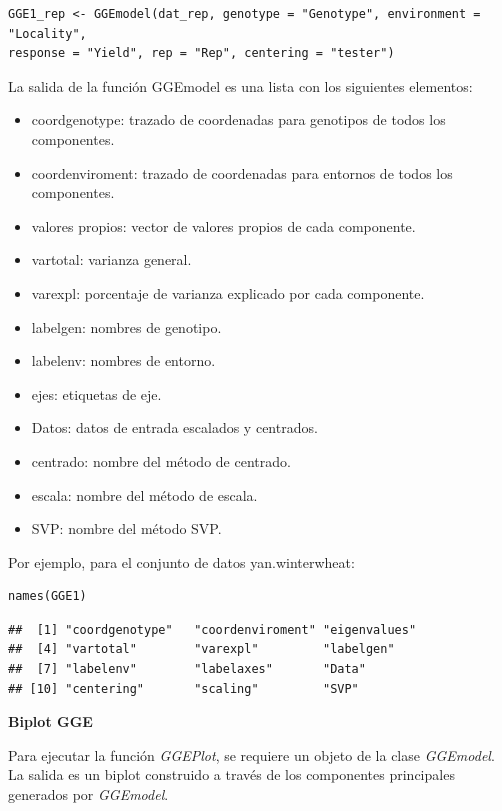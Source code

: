 \begin{lstlisting}
GGE1_rep <- GGEmodel(dat_rep, genotype = "Genotype", environment = "Locality", 
response = "Yield", rep = "Rep", centering = "tester")
\end{lstlisting}


La salida de la función GGEmodel es una lista con los siguientes elementos:


\begin{itemize}
\item coordgenotype: trazado de coordenadas para genotipos de todos los componentes.
\item coordenviroment: trazado de coordenadas para entornos de todos los componentes.
\item valores propios: vector de valores propios de cada componente.
\item vartotal: varianza general.
\item varexpl: porcentaje de varianza explicado por cada componente.
\item labelgen: nombres de genotipo.
\item labelenv: nombres de entorno.
\item ejes: etiquetas de eje.
\item Datos: datos de entrada escalados y centrados.
\item centrado: nombre del método de centrado.
\item escala: nombre del método de escala.
\item SVP: nombre del método SVP.
\end{itemize}


Por ejemplo, para el conjunto de datos yan.winterwheat:


\begin{lstlisting}
names(GGE1)
\end{lstlisting}

\begin{verbatim}
##  [1] "coordgenotype"   "coordenviroment" "eigenvalues"    
##  [4] "vartotal"        "varexpl"         "labelgen"       
##  [7] "labelenv"        "labelaxes"       "Data"           
## [10] "centering"       "scaling"         "SVP"
\end{verbatim}


\textbf{Biplot GGE}

Para ejecutar la función \emph{GGEPlot}, se requiere un objeto de la clase \emph{GGEmodel}. La salida es un biplot construido a través de los componentes principales generados por \emph{GGEmodel}.

